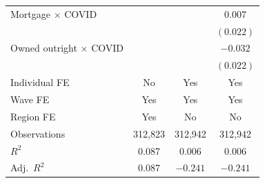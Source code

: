 \documentclass[12pt,a4paper]{article}
\begin{document}
\begin{ThreePartTable}
\begin{longtable}{lccc}
Mortgage $\times$ COVID      & & & $0.007$  \\
                             & & & $(0.022)$ \\[0.3em]
Owned outright $\times$ COVID & & & $-0.032$ \\
                              & & & $(0.022)$ \\[0.5em]
Individual FE & No  & Yes & Yes \\
Wave FE       & Yes & Yes & Yes \\
Region FE     & Yes & No  & No  \\
\midrule
Observations  & 312{,}823 & 312{,}942 & 312{,}942 \\
$R^{2}$       & 0.087     & 0.006     & 0.006     \\
Adj.\ $R^{2}$ & 0.087     & $-0.241$  & $-0.241$  \\
\bottomrule
\end{longtable}
\end{ThreePartTable}
\end{document}
